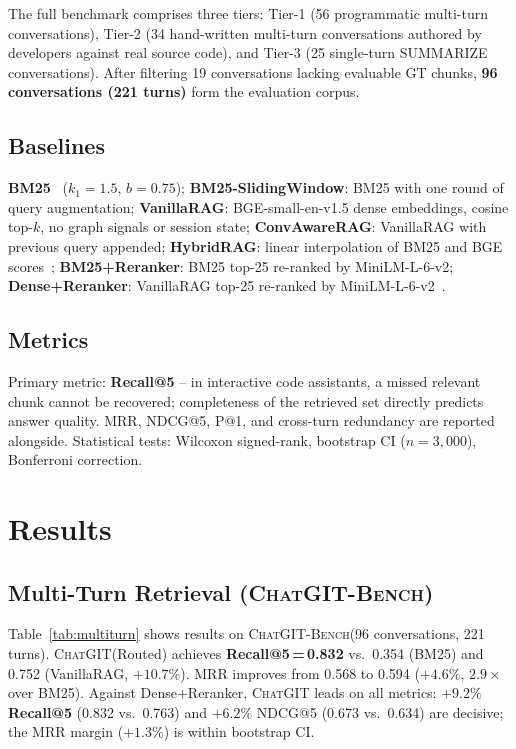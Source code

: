 \documentclass[conference]{IEEEtran}
\newcommand{\chatgit}{\textsc{ChatGIT}\xspace}
\newcommand{\conv}{\textsc{ChatGIT-Bench}\xspace}
\begin{document}
The full benchmark comprises three tiers: Tier-1 (56 programmatic
multi-turn conversations), Tier-2 (34 hand-written multi-turn
conversations authored by developers against real source code), and
Tier-3 (25 single-turn SUMMARIZE conversations). After filtering 19
conversations lacking evaluable GT chunks, \textbf{96 conversations
(221 turns)} form the evaluation corpus.

\subsection{Baselines}

\textbf{BM25}~\cite{robertson2009bm25} ($k_1{=}1.5$, $b{=}0.75$);
\textbf{BM25-SlidingWindow}: BM25 with one round of query augmentation;
\textbf{VanillaRAG}: BGE-small-en-v1.5 dense embeddings, cosine top-$k$,
no graph signals or session state;
\textbf{ConvAwareRAG}: VanillaRAG with previous query appended;
\textbf{HybridRAG}: linear interpolation of BM25 and BGE scores~\cite{karpukhin2020dense};
\textbf{BM25+Reranker}: BM25 top-25 re-ranked by MiniLM-L-6-v2;
\textbf{Dense+Reranker}: VanillaRAG top-25 re-ranked by MiniLM-L-6-v2~\cite{nogueira2019passage}.

\subsection{Metrics}

Primary metric: \textbf{Recall@5} -- in interactive code assistants,
a missed relevant chunk cannot be recovered; completeness of the
retrieved set directly predicts answer quality. MRR, NDCG@5, P@1, and
cross-turn redundancy are reported alongside.
Statistical tests: Wilcoxon signed-rank, bootstrap CI ($n{=}3{,}000$),
Bonferroni correction.

\FloatBarrier   %
\section{Results}
\label{sec:results}

\subsection{Multi-Turn Retrieval (\conv)}

Table~\ref{tab:multiturn} shows results on \conv (96 conversations, 221 turns).
\chatgit (Routed) achieves \textbf{Recall@5\,=\,0.832} vs.\ 0.354 (BM25)
and 0.752 (VanillaRAG, $+10.7\%$). MRR improves from 0.568 to 0.594
($+4.6\%$, $2.9\times$ over BM25). Against Dense+Reranker, \chatgit leads
on all metrics: \textbf{$+9.2\%$ Recall@5} (0.832 vs.\ 0.763) and
$+6.2\%$ NDCG@5 (0.673 vs.\ 0.634) are decisive; the MRR margin
($+1.3\%$) is within bootstrap CI.
\end{document}
